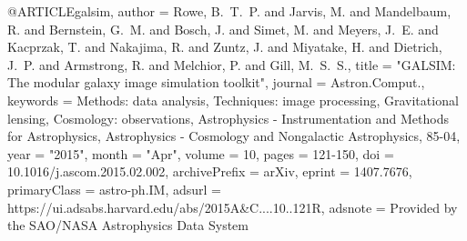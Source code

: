 
@ARTICLE{galsim,
       author = {{Rowe}, B.~T.~P. and {Jarvis}, M. and {Mandelbaum}, R. and
         {Bernstein}, G.~M. and {Bosch}, J. and {Simet}, M. and {Meyers}, J.~E. and
         {Kacprzak}, T. and {Nakajima}, R. and {Zuntz}, J. and {Miyatake}, H. and
         {Dietrich}, J.~P. and {Armstrong}, R. and {Melchior}, P. and
         {Gill}, M.~S.~S.},
        title = "{GALSIM: The modular galaxy image simulation toolkit}",
      journal = {Astron.Comput.},
     keywords = {Methods: data analysis, Techniques: image processing, Gravitational lensing, Cosmology: observations, Astrophysics - Instrumentation and Methods for Astrophysics, Astrophysics - Cosmology and Nongalactic Astrophysics, 85-04},
         year = "2015",
        month = "Apr",
       volume = {10},
        pages = {121-150},
          doi = {10.1016/j.ascom.2015.02.002},
archivePrefix = {arXiv},
       eprint = {1407.7676},
 primaryClass = {astro-ph.IM},
       adsurl = {https://ui.adsabs.harvard.edu/abs/2015A&C....10..121R},
      adsnote = {Provided by the SAO/NASA Astrophysics Data System}
}
